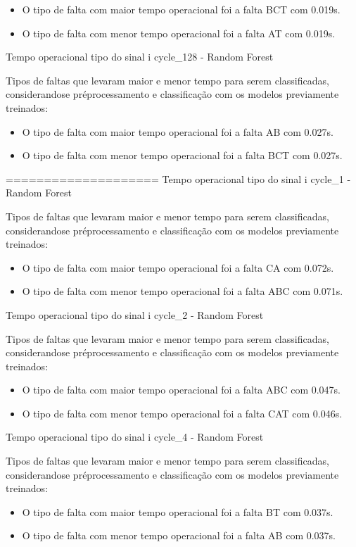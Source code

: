 \begin{itemize}
\item O tipo de falta com maior tempo operacional foi a falta BCT com 0.019s.
\item O tipo de falta com menor tempo operacional foi a falta AT com 0.019s.
\end{itemize}
Tempo operacional tipo do sinal i cycle_128 - Random Forest
\item Tipos de faltas que levaram maior e menor tempo para serem classificadas, considerando\hyph se pré\hyph processamento e classificação com os modelos previamente treinados:
\begin{itemize}
\item O tipo de falta com maior tempo operacional foi a falta AB com 0.027s.
\item O tipo de falta com menor tempo operacional foi a falta BCT com 0.027s.
\end{itemize}
====================
Tempo operacional tipo do sinal i cycle_1 - Random Forest
\item Tipos de faltas que levaram maior e menor tempo para serem classificadas, considerando\hyph se pré\hyph processamento e classificação com os modelos previamente treinados:
\begin{itemize}
\item O tipo de falta com maior tempo operacional foi a falta CA com 0.072s.
\item O tipo de falta com menor tempo operacional foi a falta ABC com 0.071s.
\end{itemize}
Tempo operacional tipo do sinal i cycle_2 - Random Forest
\item Tipos de faltas que levaram maior e menor tempo para serem classificadas, considerando\hyph se pré\hyph processamento e classificação com os modelos previamente treinados:
\begin{itemize}
\item O tipo de falta com maior tempo operacional foi a falta ABC com 0.047s.
\item O tipo de falta com menor tempo operacional foi a falta CAT com 0.046s.
\end{itemize}
Tempo operacional tipo do sinal i cycle_4 - Random Forest
\item Tipos de faltas que levaram maior e menor tempo para serem classificadas, considerando\hyph se pré\hyph processamento e classificação com os modelos previamente treinados:
\begin{itemize}
\item O tipo de falta com maior tempo operacional foi a falta BT com 0.037s.
\item O tipo de falta com menor tempo operacional foi a falta AB com 0.037s.
\end{itemize}
